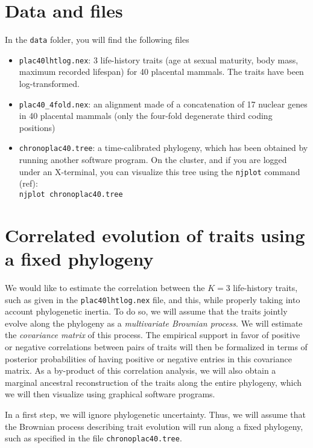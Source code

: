 \documentclass[usletter]{article}
\newcommand{\cmd}[1]{\texttt{#1}}
\begin{document}
\section*{Data and files}

In the \cmd{data} folder, you will find the following files
\begin{itemize}
\item
\cmd{plac40lhtlog.nex}: 3 life-history traits (age at sexual maturity, body mass, maximum recorded lifespan) for 40 placental mammals. The traits have been log-transformed.
\item
\cmd{plac40\_4fold.nex}: an alignment made of a concatenation of 17 nuclear genes in 40 placental mammals (only the four-fold degenerate third coding positions)
\item
\cmd{chronoplac40.tree}: a time-calibrated phylogeny, which has been obtained by running another software program.
On the cluster, and if you are logged under an X-terminal, you can visualize this tree using the \cmd{njplot} command (ref):
\\
\cmd{njplot chronoplac40.tree}
\end{itemize}

\section{Correlated evolution of traits using a fixed phylogeny}

We would like to estimate the correlation between the $K=3$ life-history traits, such as given in the \cmd{plac40lhtlog.nex} file, and this, while properly taking into account phylogenetic inertia. 
To do so, we will assume that the traits jointly evolve along the phylogeny as a \emph{multivariate Brownian process}.
We will estimate the \emph{covariance matrix} of this process. The empirical support in favor of positive or negative correlations between pairs of traits will then be formalized in terms of posterior probabilities of having positive or negative entries in this covariance matrix.
As a by-product of this correlation analysis, we will also obtain a marginal ancestral reconstruction of the traits along the entire phylogeny, which we will then visualize using graphical software programs.

In a first step, we will ignore phylogenetic uncertainty.
Thus, we will assume that the Brownian process describing trait evolution will run along a fixed phylogeny, such as specified in the file \cmd{chronoplac40.tree}.
\end{document}
